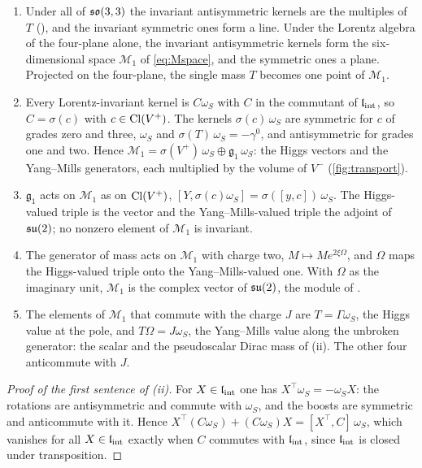 \begin{theorem}
\label{thm:massfield}
\begin{enumerate}[label=(\roman*),leftmargin=2.2em,itemsep=1pt]
\item Under all of $\mathfrak{so}(3,3)$ the invariant antisymmetric kernels are the multiples of $T$ (), and the invariant symmetric
ones form a line. Under the Lorentz algebra of the four-plane alone, the invariant antisymmetric kernels form the six-dimensional space
$\mathcal M_1$ of \cref{eq:Mspace}, and the symmetric ones a plane. Projected on the four-plane, the single mass $T$ becomes one point of
$\mathcal M_1$.
\item Every Lorentz-invariant kernel is $C\omega_S$ with $C$ in the commutant of $\mathfrak l_{\rm int}$, so $C=\sigma(c)$ with $c\in\mathrm{Cl}(V^+)$. The kernels
$\sigma(c)\,\omega_S$ are symmetric for $c$ of grades zero and three, $\omega_S$ and $\sigma(T)\,\omega_S=-\gamma^0$, and antisymmetric for
grades one and two. Hence $\mathcal M_1=\sigma(V^+)\,\omega_S\oplus\mathfrak g_1\,\omega_S$: the Higgs vectors and the Yang--Mills generators,
each multiplied by the volume of $V^-$ (\cref{fig:transport}).
\item $\mathfrak g_1$ acts on $\mathcal M_1$ as on $\mathrm{Cl}(V^+)$, $[Y,\sigma(c)\omega_S]=\sigma([y,c])\,\omega_S$. The Higgs-valued triple is the
vector and the Yang--Mills-valued triple the adjoint of $\mathfrak{su}(2)$; no nonzero element of $\mathcal M_1$ is invariant.
\item The generator of mass acts on $\mathcal M_1$ with charge two, $M\mapsto Me^{2\xi\Omega}$, and $\Omega$ maps the Higgs-valued triple onto
the Yang--Mills-valued one. With $\Omega$ as the imaginary unit, $\mathcal M_1$ is the complex vector of $\mathfrak{su}(2)$, the module of
.
\item The elements of $\mathcal M_1$ that commute with the charge $J$ are $T=\Gamma\omega_S$, the Higgs value at the pole, and
$T\Omega=J\omega_S$, the Yang--Mills value along the unbroken generator: the scalar and the pseudoscalar Dirac mass of (ii).
The other four anticommute with $J$.
\end{enumerate}
\end{theorem}

\begin{proof}[Proof of the first sentence of (ii)]
For $X\in\mathfrak l_{\rm int}$ one has $X^\top\omega_S=-\omega_SX$: the rotations are antisymmetric and commute with $\omega_S$, and the boosts are
symmetric and anticommute with it. Hence $X^\top(C\omega_S)+(C\omega_S)X=[X^\top,C]\,\omega_S$, which vanishes for all $X\in\mathfrak l_{\rm int}$ exactly
when $C$ commutes with $\mathfrak l_{\rm int}$, since $\mathfrak l_{\rm int}$ is closed under transposition.
\end{proof}

